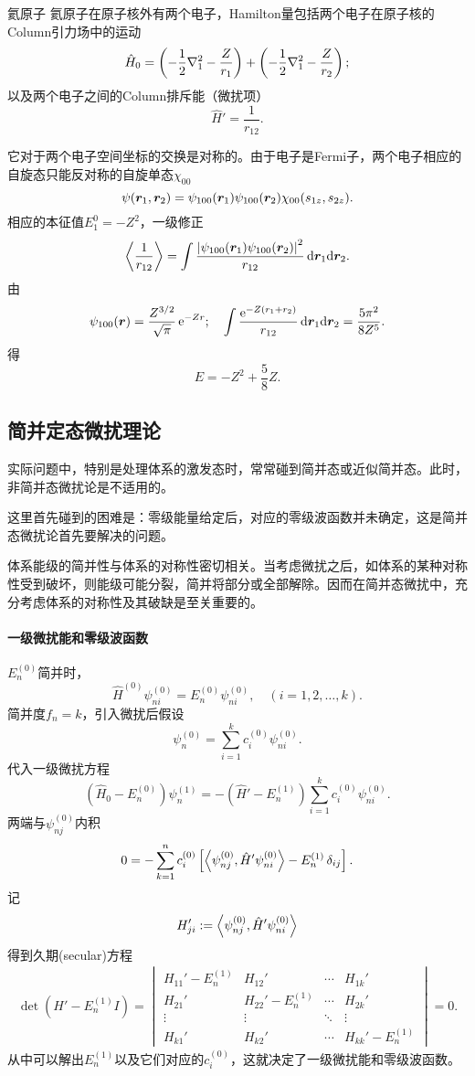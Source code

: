 \begin{example}{氦原子}{}
	氦原子在原子核外有两个电子，Hamilton量包括两个电子在原子核的Column引力场中的运动
	\[
		\hat H_0=\left(-\frac12\nabla_1^2-\frac Z{r_1}\right)+\left(-\frac12\nabla_1^2-\frac Z{r_2}\right);
\]
	以及两个电子之间的Column排斥能（微扰项）
	\[
		\hat H'=\frac1{r_{12}}.
\]

	它对于两个电子空间坐标的交换是对称的。由于电子是Fermi子，两个电子相应的自旋态只能反对称的自旋单态$\chi_{00}$
	\[
		\psi(\bm r_1,\bm r_2)=\psi_{100}(\bm r_1)\psi_{100}(\bm r_2)\chi_{00}(s_{1z},s_{2z}).
\]
	相应的本征值$E_1^0=-Z^2$，一级修正
	\[
		\left\langle \frac1{r_{12}}\right\rangle=\int\frac{\left\lvert\psi_{100}(\bm r_1)\psi_{100}(\bm r_2)\right\rvert^2}{r_{12}}\mathop{}\!\mathrm{d}\bm r_1\mathrm{d}\bm r_2.
\]
	由
	\[
		\psi_{100}(\bm r)=\frac{Z^{3/2}}{\sqrt\pi}\mathop{}\!\mathrm{e}^{-Zr};\quad \int\frac{\mathop{}\!\mathrm{e}^{-Z(r_1+r_2)}}{r_{12}}\mathop{}\!\mathrm{d}\bm r_1\mathrm{d}\bm r_2=\frac{5\pi^2}{8Z^5}.
\]
	得
	\[
E=-Z^2+\frac58Z.
\]
\end{example}
\subsection{简并定态微扰理论}
实际问题中，特别是处理体系的激发态时，常常碰到简并态或近似简并态。此时，非简并态微扰论是不适用的。

这里首先碰到的困难是：零级能量给定后，对应的零级波函数并未确定，这是简并态微扰论首先要解决的问题。

体系能级的简并性与体系的对称性密切相关。当考虑微扰之后，如体系的某种对称性受到破坏，则能级可能分裂，简并将部分或全部解除。因而在简并态微扰中，充分考虑体系的对称性及其破缺是至关重要的。
\paragraph*{一级微扰能和零级波函数}$E_n^{(0)}$简并时，
\[
	\hat H^{(0)}\psi_{ni}^{(0)}=E_n^{(0)}\psi_{ni}^{(0)},\quad (i=1,2,\ldots,k).
\]
简并度$f_n=k$，引入微扰后假设
\[
	\psi_n^{(0)}=\sum_{i=1}^kc_i^{(0)}\psi_{ni}^{(0)}.
\]
代入一级微扰方程
\[
	(\hat H_0-E_n^{(0)})\psi_n^{(1)}=-(\hat H'-E_n^{(1)})\sum_{i=1}^kc_i^{(0)}\psi_{ni}^{(0)}.
\]
两端与$\psi_{nj}^{(0)}$内积
\[
0=-\sum_{k=1}^nc_i^{(0)}\left[\left\langle \psi_{nj}^{(0)},\hat H'\psi_{ni}^{(0)}\right\rangle-E_n^{(1)}\mathop{}\!\delta_{ij}\right].
\]
记
\begin{align}
	H_{ji}':=\left\langle \psi_{nj}^{(0)},\hat H'\psi_{ni}^{(0)}\right\rangle
\end{align}
得到久期(secular)方程
\begin{align}
	\det(H'-E_n^{(1)}I)=\begin{vmatrix}
		H_{11}'-E_n^{(1)}&H_{12}'&\cdots&H_{1k}'\\
		H_{21}'&H_{22}'-E_n^{(1)}&\cdots&H_{2k}'\\
		\vdots&\vdots&\ddots&\vdots\\
		H_{k1}'&H_{k2}'&\cdots&H_{kk}'-E_n^{(1)}
	\end{vmatrix}=0.
\end{align}
从中可以解出$E_n^{(1)}$以及它们对应的$c_i^{(0)}$，这就决定了一级微扰能和零级波函数。
